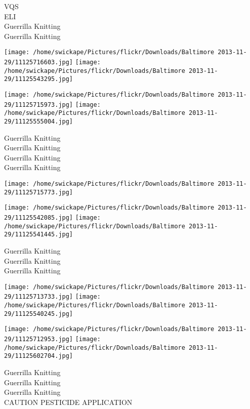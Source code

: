 \documentclass[10pt,letterpaper]{article}
\begin{document}
VQS\\
ELI\\
Guerrilla Knitting\\
Guerrilla Knitting\\
\pagebreak

\texttt{[image: /home/swickape/Pictures/flickr/Downloads/Baltimore 2013-11-29/11125716603.jpg]}
\texttt{[image: /home/swickape/Pictures/flickr/Downloads/Baltimore 2013-11-29/11125543295.jpg]}

\texttt{[image: /home/swickape/Pictures/flickr/Downloads/Baltimore 2013-11-29/11125715973.jpg]}
\texttt{[image: /home/swickape/Pictures/flickr/Downloads/Baltimore 2013-11-29/11125555004.jpg]}

Guerrilla Knitting\\
Guerrilla Knitting\\
Guerrilla Knitting\\
Guerrilla Knitting\\
\pagebreak

\texttt{[image: /home/swickape/Pictures/flickr/Downloads/Baltimore 2013-11-29/11125715773.jpg]}

\vspace{0.25in}
\texttt{[image: /home/swickape/Pictures/flickr/Downloads/Baltimore 2013-11-29/11125542085.jpg]}
\texttt{[image: /home/swickape/Pictures/flickr/Downloads/Baltimore 2013-11-29/11125541445.jpg]}

Guerrilla Knitting\\
Guerrilla Knitting\\
Guerrilla Knitting\\
\pagebreak

\texttt{[image: /home/swickape/Pictures/flickr/Downloads/Baltimore 2013-11-29/11125713733.jpg]}
\texttt{[image: /home/swickape/Pictures/flickr/Downloads/Baltimore 2013-11-29/11125540245.jpg]}

\texttt{[image: /home/swickape/Pictures/flickr/Downloads/Baltimore 2013-11-29/11125712953.jpg]}
\texttt{[image: /home/swickape/Pictures/flickr/Downloads/Baltimore 2013-11-29/11125602704.jpg]}

Guerrilla Knitting\\
Guerrilla Knitting\\
Guerrilla Knitting\\
CAUTION PESTICIDE APPLICATION\\
\pagebreak
\end{document}
